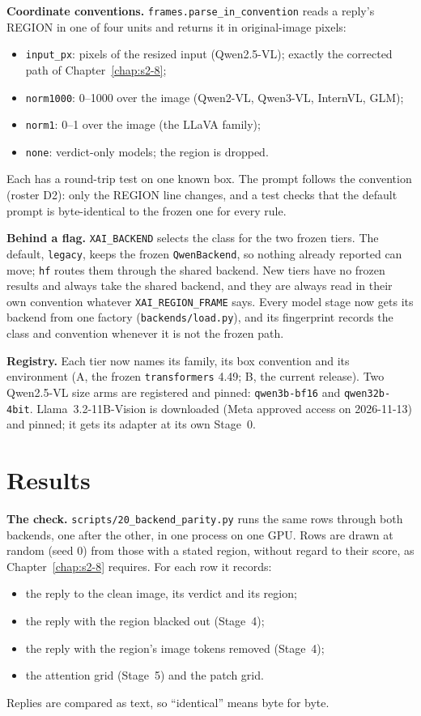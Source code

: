 \textbf{Coordinate conventions.} \texttt{frames.parse\_in\_convention} reads a reply's REGION in one of
four units and returns it in original-image pixels:
\begin{itemize}
\item \texttt{input\_px}: pixels of the resized input (Qwen2.5-VL); exactly the corrected path of
Chapter~\ref{chap:s2-8};
\item \texttt{norm1000}: 0--1000 over the image (Qwen2-VL, Qwen3-VL, InternVL, GLM);
\item \texttt{norm1}: 0--1 over the image (the LLaVA family);
\item \texttt{none}: verdict-only models; the region is dropped.
\end{itemize}
Each has a round-trip test on one known box. The prompt follows the convention (roster D2): only the
REGION line changes, and a test checks that the default prompt is byte-identical to the frozen one for
every rule.

\textbf{Behind a flag.} \texttt{XAI\_BACKEND} selects the class for the two frozen tiers. The default,
\texttt{legacy}, keeps the frozen \texttt{QwenBackend}, so nothing already reported can move;
\texttt{hf} routes them through the shared backend. New tiers have no frozen results and always take the
shared backend, and they are always read in their own convention whatever \texttt{XAI\_REGION\_FRAME} says.
Every model stage now gets its backend from one factory (\texttt{backends/load.py}), and its fingerprint
records the class and convention whenever it is not the frozen path.

\textbf{Registry.} Each tier now names its family, its box convention and its environment (A, the frozen
\texttt{transformers} 4.49; B, the current release). Two Qwen2.5-VL size arms are registered and pinned:
\texttt{qwen3b-bf16} and \texttt{qwen32b-4bit}. Llama~3.2-11B-Vision is downloaded (Meta approved access on
2026-11-13) and pinned; it gets its adapter at its own Stage~0.

\section{Results}

\textbf{The check.} \texttt{scripts/20\_backend\_parity.py} runs the same rows through both backends,
one after the other, in one process on one GPU. Rows are drawn at random (seed 0) from those with a stated
region, without regard to their score, as Chapter~\ref{chap:s2-8} requires. For each row it records:
\begin{itemize}
\item the reply to the clean image, its verdict and its region;
\item the reply with the region blacked out (Stage~4);
\item the reply with the region's image tokens removed (Stage~4);
\item the attention grid (Stage~5) and the patch grid.
\end{itemize}
Replies are compared as text, so ``identical'' means byte for byte.

